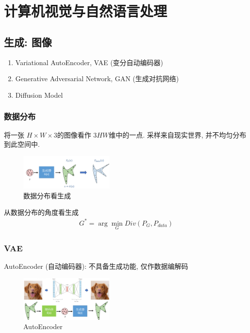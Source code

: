 \newpage
\section{计算机视觉与自然语言处理}

\subsection{生成: 图像}
\begin{enumerate}
    \item Variational AutoEncoder, VAE (变分自动编码器)
    \item Generative Adversarial Network, GAN (生成对抗网络)
    \item Diffusion Model
\end{enumerate}

\subsubsection{数据分布}
将一张 $H\times W\times 3$的图像看作 $3HW$维中的一点. 采样来自现实世界, 并不均匀分布到此空间中. 

\begin{figure}[!htb]
    \centering
    \includegraphics[width=0.42\textwidth]{pic/DL3/数据生成}
    \caption{数据分布看生成}
\end{figure}

从数据分布的角度看生成
\begin{align*}
    G^*=\arg \min_G Div(P_G, P_{data})
\end{align*}

\subsubsection{VAE}
AutoEncoder (自动编码器): 不具备生成功能, 仅作数据编解码

\begin{figure}[!htb]
    \centering
    \includegraphics[width=0.42\textwidth]{pic/DL3/AutoEncoder}
    \caption{AutoEncoder}
\end{figure}

